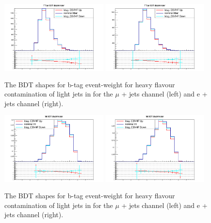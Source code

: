 \begin{figure}[ht!]
    \includegraphics[width=0.48\textwidth]{images/Run2/Sys/btag_CSVHFsystt.png}
    \includegraphics[width=0.48\textwidth]{images/Run2/Sys/btag_CSVHFsystt_e.png}     
    \caption{The BDT shapes for b-tag event-weight for heavy flavour contamination of light jets in \ttbar for the $\mu$ + jets channel (left) and e + jets channel (right).}
    \label{fig:SysShapesHFsystt}
\end{figure}
\begin{figure}[ht!]
    \includegraphics[width=0.48\textwidth]{images/Run2/Sys/btag_CSVHFsystttt.png}
    \includegraphics[width=0.48\textwidth]{images/Run2/Sys/btag_CSVHFsystttt_e.png}     
    \caption{The BDT shapes for b-tag event-weight for heavy flavour contamination of light jets in \tttt for the $\mu$ + jets channel (left) and e + jets channel (right).}
    \label{fig:SysShapesHFsystttt}
\end{figure}
